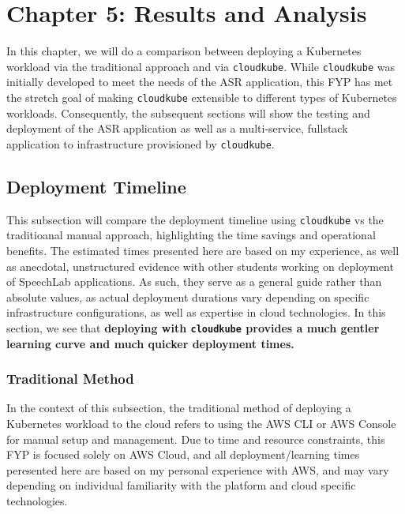 \chapter{Chapter 5: Results and Analysis}

In this chapter, we will do a comparison between deploying a Kubernetes workload via the traditional approach and via \texttt{cloudkube}. While \texttt{cloudkube} was initially developed
to meet the needs of the ASR application, this FYP has met the stretch goal of making \texttt{cloudkube} extensible to different types of Kubernetes workloads. Consequently, the subsequent sections
will show the testing and deployment of the ASR application as well as a multi-service, fullstack application to infrastructure provisioned by \texttt{cloudkube}. 

\section{Deployment Timeline}
This subsection will compare the deployment timeline using \texttt{cloudkube} vs the traditioanal manual approach, highlighting the time savings and operational benefits. 
The estimated times presented here are based on my experience, as well as anecdotal, unstructured evidence with other students working on deployment of SpeechLab applications.
As such, they serve as a general guide rather than absolute values, as actual deployment durations vary depending on specific infrastructure configurations, as well as expertise
in cloud technologies. In this section, we see that \textbf{deploying with \texttt{cloudkube} provides a much gentler learning curve and much quicker deployment times. }

\subsection{Traditional Method}

In the context of this subsection, the traditional method of deploying a Kubernetes workload to the cloud refers to using the AWS CLI or AWS Console for manual setup and management.
Due to time and resource constraints, this FYP is focused solely on AWS Cloud, and all deployment/learning times peresented here are based on my personal experience with AWS, and may vary
depending on individual familiarity with the platform and cloud specific technologies. 

